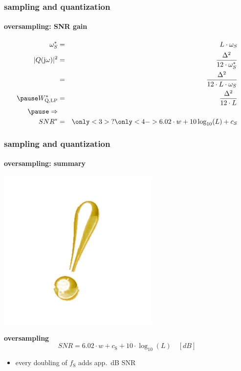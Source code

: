 	\begin{frame}\frametitle{sampling and quantization}\framesubtitle{oversampling: SNR gain}
		\begin{eqnarray*}
			\omega^\ast_S &=& L\cdot \omega_S\\
            \bigskip
			|Q(\jom)|^2 &=& \frac{\Delta^2}{12\cdot \omega^\ast_S}\\
			&=& \frac{\Delta^2}{12\cdot L\cdot \omega_S}\\
			\pause
            \bigskip
			W^\ast_\mathrm{Q,LP} &=& \frac{\Delta^2}{12\cdot L}\\
			\pause
            \Rightarrow&&\\
			SNR^\ast &=& \only<3>{?}\only<4->{6.02\cdot w + 10\log_{10} (L) + c_S}
		\end{eqnarray*}
	\end{frame}	
	\begin{frame}\frametitle{sampling and quantization}\framesubtitle{oversampling: summary}
		\vspace{-10mm}
        \begin{flushright}
			 \includegraphics[scale=.25]{Graph/exclamation-mark}
		\end{flushright}
		\begin{block}{\textbf{oversampling}}
			\centering
			\begin{equation}
				SNR = 6.02\cdot w + c_{\mathrm{S}} + 10\cdot\log_{10} (L)\quad [dB]
			\end{equation}
			\begin{itemize}
				\item	every doubling of $f_{\mathrm{S}}$ adds app.\ \unit[3]{dB} SNR
			\end{itemize}
		\end{block}
	\end{frame}	
